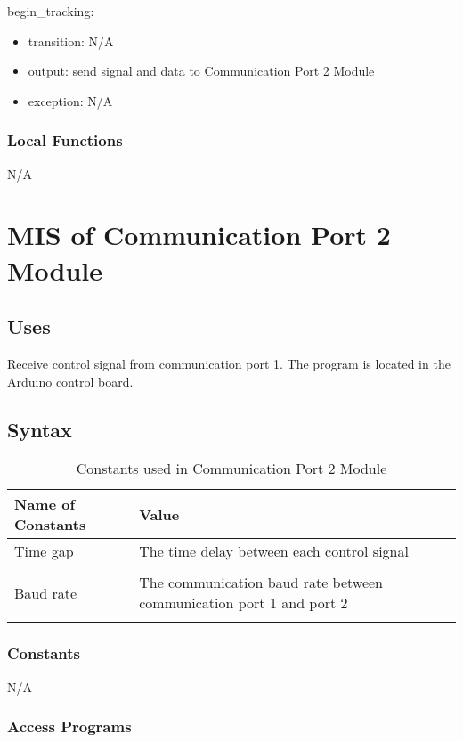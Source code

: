 \documentclass[12pt, titlepage]{article}
\begin{document}
\noindent begin\_tracking:
\begin{itemize}
\item transition: N/A
\item output: send signal and data to Communication Port 2 Module 
\item exception: N/A 
\end{itemize}


\subsubsection{Local Functions}

N/A

\newpage


\section{MIS of Communication Port 2 Module} 



\subsection{Uses}
Receive control signal from communication port 1. The program is located in the Arduino control board.

\subsection{Syntax}
\begin{table}[H]
\caption{Constants used in Communication Port 2 Module} 
\begin{tabularx}{\textwidth}{XX}
\toprule
\textbf{Name of Constants} & \textbf{Value}\\
\midrule
Time gap & The time delay between each control signal\\\\
Baud rate & The communication baud rate between communication port 1 and port 2\\\\

\bottomrule
\end{tabularx}
\end{table}


\subsubsection{Constants}
N/A

\subsubsection{Access Programs}
\end{document}
